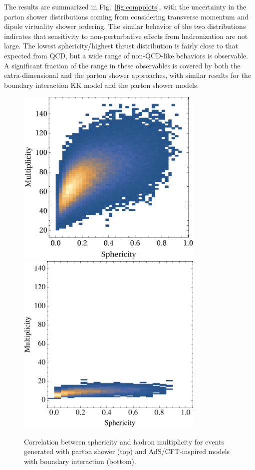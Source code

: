 The results are summarized in Fig.~\ref{fig:compplots}, with the uncertainty in the parton shower distributions coming from considering transverse momentum and dipole virtuality shower ordering. The similar behavior of the two distributions indicates that sensitivity to non-perturbative effects from hadronization are not large.  The lowest sphericity/highest thrust distribution is fairly close to that expected from QCD, but a wide range of non-QCD-like behaviors is observable. A significant fraction of the range in these observables is covered by both the extra-dimensional and the parton shower approaches, with similar results for the boundary interaction KK model and the parton shower models.

\begin{figure}[tb!]
	\centering
		\includegraphics[width=0.8\textwidth]{figures/DS_sphericity_PartonShower.pdf}\\
	\vspace{1cm}
	\includegraphics[width=0.8\textwidth]{figures/DS_sphericity_KK_bdry.pdf}
	\caption{Correlation between sphericity and hadron multiplicity for events generated with parton shower (top) and AdS/CFT-inspired models with boundary interaction (bottom).}
	\label{fig:compmult}
\end{figure}

